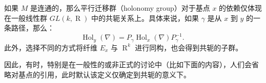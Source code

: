 如果 \(M\) 是连通的，那么平行迁移群（holonomy group）对于基点 \(x\) 的依赖仅体现在一般线性群 \(GL(k, \operatorname{R})\) 中的共轭关系上。具体来说，如果 \(\gamma\) 是从 \(x\) 到 \(y\) 的一条路径，那么：
\[
\operatorname{Hol}_y(\nabla) = P_\gamma \operatorname{Hol}_x(\nabla) P_\gamma^{-1}.~
\]
此外，选择不同的方式将纤维 \(E_x\) 与 \(\operatorname{R}^k\) 进行同构，也会得到共轭的子群。  

因此，有时，特别是在一般性的或非正式的讨论中（比如下面的内容），人们会省略对基点的引用，此时默认该定义仅确定到共轭的意义下。